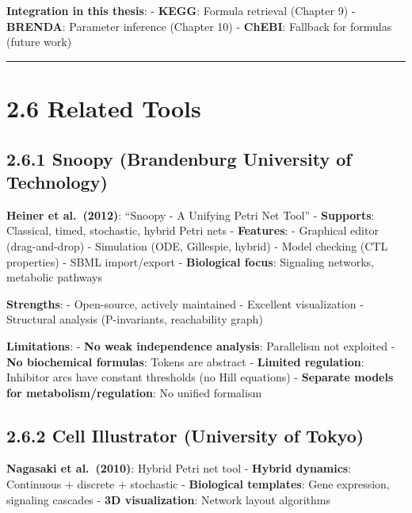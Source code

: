 \textbf{Integration in this thesis}: - \textbf{KEGG}: Formula retrieval
(Chapter 9) - \textbf{BRENDA}: Parameter inference (Chapter 10) -
\textbf{ChEBI}: Fallback for formulas (future work)

\begin{center}\rule{0.5\linewidth}{0.5pt}\end{center}

\hypertarget{related-tools}{%
\section{2.6 Related Tools}\label{related-tools}}

\hypertarget{snoopy-brandenburg-university-of-technology}{%
\subsection{2.6.1 Snoopy (Brandenburg University of
Technology)}\label{snoopy-brandenburg-university-of-technology}}

\textbf{Heiner et al.~(2012)}: ``Snoopy - A Unifying Petri Net Tool'' -
\textbf{Supports}: Classical, timed, stochastic, hybrid Petri nets -
\textbf{Features}: - Graphical editor (drag-and-drop) - Simulation (ODE,
Gillespie, hybrid) - Model checking (CTL properties) - SBML
import/export - \textbf{Biological focus}: Signaling networks, metabolic
pathways

\textbf{Strengths}: - Open-source, actively maintained - Excellent
visualization - Structural analysis (P-invariants, reachability graph)

\textbf{Limitations}: - \textbf{No weak independence analysis}:
Parallelism not exploited - \textbf{No biochemical formulas}: Tokens are
abstract - \textbf{Limited regulation}: Inhibitor arcs have constant
thresholds (no Hill equations) - \textbf{Separate models for
metabolism/regulation}: No unified formalism

\hypertarget{cell-illustrator-university-of-tokyo}{%
\subsection{2.6.2 Cell Illustrator (University of
Tokyo)}\label{cell-illustrator-university-of-tokyo}}

\textbf{Nagasaki et al.~(2010)}: Hybrid Petri net tool - \textbf{Hybrid
dynamics}: Continuous + discrete + stochastic - \textbf{Biological
templates}: Gene expression, signaling cascades - \textbf{3D
visualization}: Network layout algorithms

